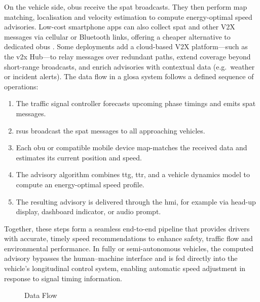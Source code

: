 On the vehicle side, \acp{obu} receive the \ac{spat} broadcasts. They then perform \ac{map} matching, localisation and velocity estimation to compute energy-optimal speed advisories. \cite{Sambeek2015} Low-cost smartphone apps can also collect \ac{spat} and other V2X messages via cellular or Bluetooth links, offering a cheaper alternative to dedicated \acp{obu} \cite{Gao2016}. Some deployments add a cloud-based V2X platform—such as the \ac{v2x} Hub—to relay messages over redundant paths, extend coverage beyond short-range broadcasts, and enrich advisories with contextual data (e.g.\ weather or incident alerts). \cite{Hadi2023}
\mynewline
The data flow in a \ac{glosa} system follows a defined sequence of operations:

\begin{enumerate}[leftmargin=*, label=\textbf{Step \arabic*:}]
  \item The traffic signal controller forecasts upcoming phase timings and emits \ac{spat} messages.
  \item \acp{rsu} broadcast the \ac{spat} messages to all approaching vehicles.
  \item Each \ac{obu} or compatible mobile device \ac{map}-matches the received data and estimates its current position and speed.
  \item The advisory algorithm combines \ac{ttg}, \ac{ttr}, and a vehicle dynamics model to compute an energy-optimal speed profile.
  \item The resulting advisory is delivered through the \ac{hmi}, for example via head-up display, dashboard indicator, or audio prompt.
\end{enumerate}

Together, these steps form a seamless end-to-end pipeline that provides drivers with accurate, timely speed recommendations to enhance safety, traffic flow and environmental performance. In fully or semi-autonomous vehicles, the computed advisory bypasses the human–machine interface and is fed directly into the vehicle’s longitudinal control system, enabling automatic speed adjustment in response to signal timing information.

\begin{figure}[htbp]
  \centering
  \caption{Data Flow}
  \label{fig:glosa_architecture}
\end{figure}

